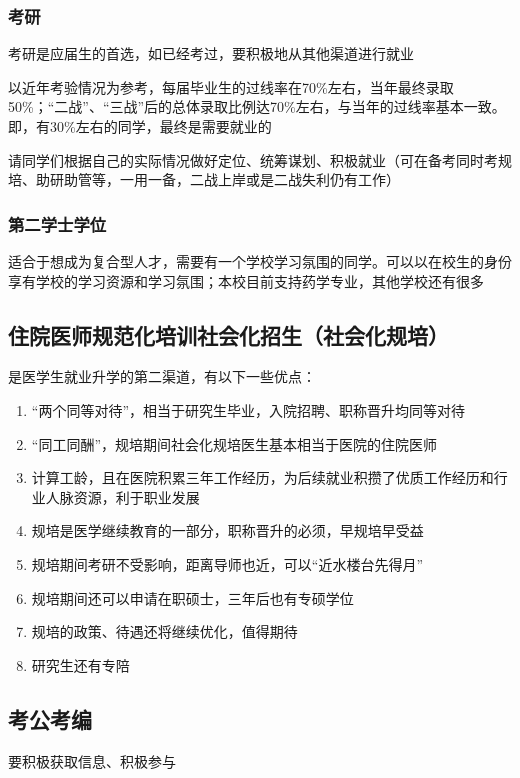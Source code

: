 \subsubsection[考研]{考研}
考研是应届生的首选，如已经考过，要积极地从其他渠道进行就业

以近年考验情况为参考，每届毕业生的过线率在70\%左右，当年最终录取50\%；“二战”、“三战”后的总体录取比例达70\%左右，与当年的过线率基本一致。即，有30\%左右的同学，最终是需要就业的

请同学们根据自己的实际情况做好定位、统筹谋划、积极就业（可在备考同时考规培、助研助管等，一用一备，二战上岸或是二战失利仍有工作）

\subsubsection[第二学士学位]{第二学士学位}
适合于想成为复合型人才，需要有一个学校学习氛围的同学。可以以在校生的身份享有学校的学习资源和学习氛围；本校目前支持药学专业，其他学校还有很多

\subsection[住院医师规范化培训社会化招生（社会化规培）]{住院医师规范化培训社会化招生（社会化规培）}
是医学生就业升学的第二渠道，有以下一些优点：
\begin{enumerate}
    \item “两个同等对待”，相当于研究生毕业，入院招聘、职称晋升均同等对待
    \item “同工同酬”，规培期间社会化规培医生基本相当于医院的住院医师
    \item 计算工龄，且在医院积累三年工作经历，为后续就业积攒了优质工作经历和行业人脉资源，利于职业发展
    \item 规培是医学继续教育的一部分，职称晋升的必须，早规培早受益
    \item 规培期间考研不受影响，距离导师也近，可以“近水楼台先得月”
    \item 规培期间还可以申请在职硕士，三年后也有专硕学位
    \item 规培的政策、待遇还将继续优化，值得期待
    \item 研究生还有专陪
\end{enumerate}

\subsection[考公考编]{考公考编}
要积极获取信息、积极参与

